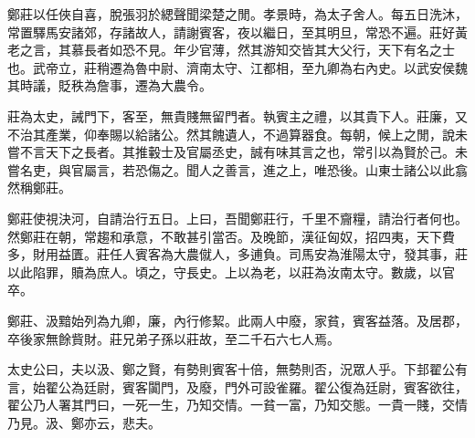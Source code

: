 鄭莊以任俠自喜，脫張羽於緦聲聞梁楚之閒。孝景時，為太子舍人。每五日洗沐，常置驛馬安諸郊，存諸故人，請謝賓客，夜以繼日，至其明旦，常恐不遍。莊好黃老之言，其慕長者如恐不見。年少官薄，然其游知交皆其大父行，天下有名之士也。武帝立，莊稍遷為魯中尉、濟南太守、江都相，至九卿為右內史。以武安侯魏其時議，貶秩為詹事，遷為大農令。

莊為太史，誡門下，客至，無貴賤無留門者。執賓主之禮，以其貴下人。莊廉，又不治其產業，仰奉賜以給諸公。然其餽遺人，不過算器食。每朝，候上之閒，說未嘗不言天下之長者。其推轂士及官屬丞史，誠有味其言之也，常引以為賢於己。未嘗名吏，與官屬言，若恐傷之。聞人之善言，進之上，唯恐後。山東士諸公以此翕然稱鄭莊。

鄭莊使視決河，自請治行五日。上曰，吾聞鄭莊行，千里不齎糧，請治行者何也。然鄭莊在朝，常趨和承意，不敢甚引當否。及晚節，漢征匈奴，招四夷，天下費多，財用益匱。莊任人賓客為大農僦人，多逋負。司馬安為淮陽太守，發其事，莊以此陷罪，贖為庶人。頃之，守長史。上以為老，以莊為汝南太守。數歲，以官卒。

鄭莊、汲黯始列為九卿，廉，內行修絜。此兩人中廢，家貧，賓客益落。及居郡，卒後家無餘貲財。莊兄弟子孫以莊故，至二千石六七人焉。

太史公曰，夫以汲、鄭之賢，有勢則賓客十倍，無勢則否，況眾人乎。下邽翟公有言，始翟公為廷尉，賓客闐門，及廢，門外可設雀羅。翟公復為廷尉，賓客欲往，翟公乃人署其門曰，一死一生，乃知交情。一貧一富，乃知交態。一貴一賤，交情乃見。汲、鄭亦云，悲夫。